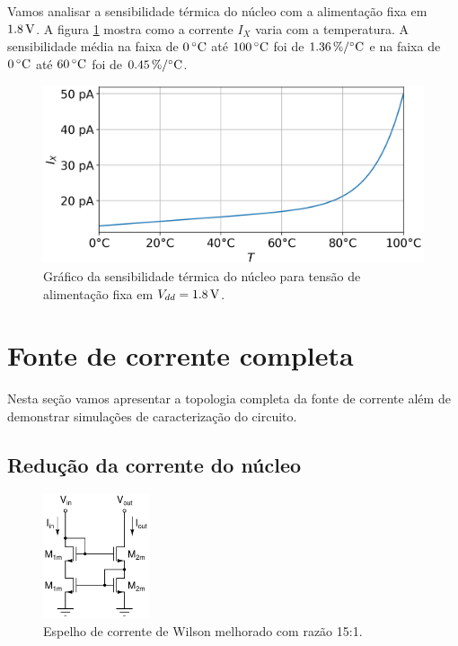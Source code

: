 \documentclass[10pt,a4paper]{extreport}
\newcommand{\?}{\stackrel{?}{=}}
\newcommand{\sis}[2]{\complexnum{#1}\,\si[per-mode=symbol]{#2}}
\newcommand{\mysize}{0.69}
\begin{document}
Vamos analisar a sensibilidade térmica do núcleo com a alimentação fixa em $\sis{1.8}{\volt}$. A figura \ref{fig:core_temp_sweep} mostra como a corrente $I_X$ varia com a temperatura. A sensibilidade média na faixa de $\sis{0}{\celsius}$ até $\sis{100}{\celsius}$ foi de $\sis{1.36}{\percent\per\celsius}$ e na faixa de $\sis{0}{\celsius}$ até $\sis{60}{\celsius}$ foi de $\sis{0.45}{\percent\per\celsius}$.

\begin{figure}[htp!]
    \includegraphics[width=\mysize\linewidth]{Imagens/core_temp_sweep.png}
    \centering
    \caption{Gráfico da sensibilidade térmica do núcleo para tensão de alimentação fixa em $V_{dd}=\sis{1.8}{\volt}$.}
    \label{fig:core_temp_sweep}
\end{figure}

\section{Fonte de corrente completa}

Nesta seção vamos apresentar a topologia completa da fonte de corrente além de demonstrar simulações de caracterização do circuito.

\subsection{Redução da corrente do núcleo}

\begin{figure}
    \centering
    \vspace{-0.5cm}
    \includegraphics[width=0.28\textwidth]{Imagens/mirror.jpg}
    \caption{Espelho de corrente de Wilson melhorado com razão 15:1.}
    \label{fig:mirror}
\end{figure}
\end{document}
